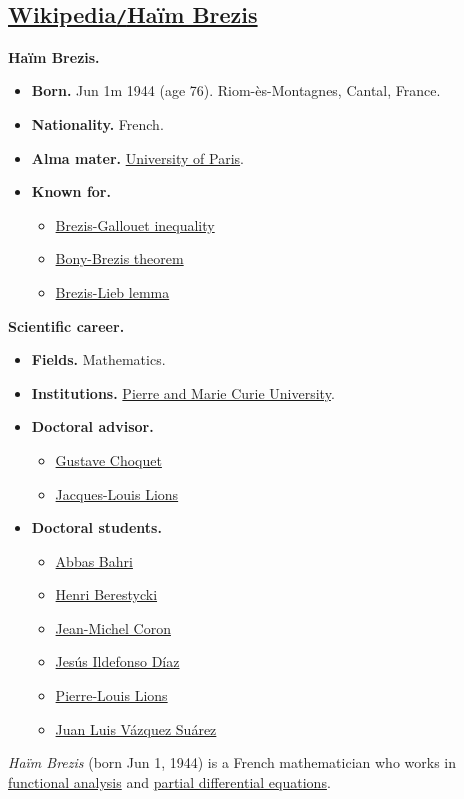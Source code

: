 \documentclass{article}
\begin{document}
\subsection{\href{https://en.wikipedia.org/wiki/Haim_Brezis}{Wikipedia{\tt/}Ha\"im Brezis}}
\textbf{Haïm Brezis.}
\begin{itemize}
	\item \textbf{Born.} Jun 1m 1944 (age 76). Riom-ès-Montagnes, Cantal, France.
	\item \textbf{Nationality.} French.
	\item \textbf{Alma mater.} \href{https://en.wikipedia.org/wiki/University_of_Paris}{University of Paris}.
	\item \textbf{Known for.}
	\begin{itemize}
		\item \href{https://en.wikipedia.org/wiki/Brezis-Gallouet_inequality}{Brezis-Gallouet inequality}
		\item \href{https://en.wikipedia.org/wiki/Bony-Brezis_theorem}{Bony-Brezis theorem}
		\item \href{https://en.wikipedia.org/wiki/Brezis-Lieb_lemma}{Brezis-Lieb lemma}
	\end{itemize}
\end{itemize}
\textbf{Scientific career.}
\begin{itemize}
	\item \textbf{Fields.} Mathematics.
	\item \textbf{Institutions.} \href{https://en.wikipedia.org/wiki/Pierre_and_Marie_Curie_University}{Pierre and Marie Curie University}.
	\item \textbf{Doctoral advisor.}
	\begin{itemize}
		\item \href{https://en.wikipedia.org/wiki/Gustave_Choquet}{Gustave Choquet}
		\item \href{https://en.wikipedia.org/wiki/Jacques-Louis_Lions}{Jacques-Louis Lions}
	\end{itemize}
	\item \textbf{Doctoral students.}
	\begin{itemize}
		\item \href{https://en.wikipedia.org/wiki/Abbas_Bahri}{Abbas Bahri}
		\item \href{https://en.wikipedia.org/wiki/Jean-Michel_Coron}{Henri Berestycki}
		\item \href{https://en.wikipedia.org/wiki/Jean-Michel_Coron}{Jean-Michel Coron}
		\item \href{https://en.wikipedia.org/wiki/Jes%C3%BAs_Ildefonso_D%C3%ADaz}{Jes\'us Ildefonso D\'iaz}
		\item \href{https://en.wikipedia.org/wiki/Pierre-Louis_Lions}{Pierre-Louis Lions}
		\item \href{https://en.wikipedia.org/wiki/Juan_Luis_V%C3%A1zquez_Su%C3%A1rez}{Juan Luis V\'azquez Su\'arez}
	\end{itemize}
\end{itemize}
\textit{Haïm Brezis} (born Jun 1, 1944) is a French mathematician who works in \href{https://en.wikipedia.org/wiki/Functional_analysis}{functional analysis} and \href{https://en.wikipedia.org/wiki/Partial_differential_equation}{partial differential equations}.
\end{document}
